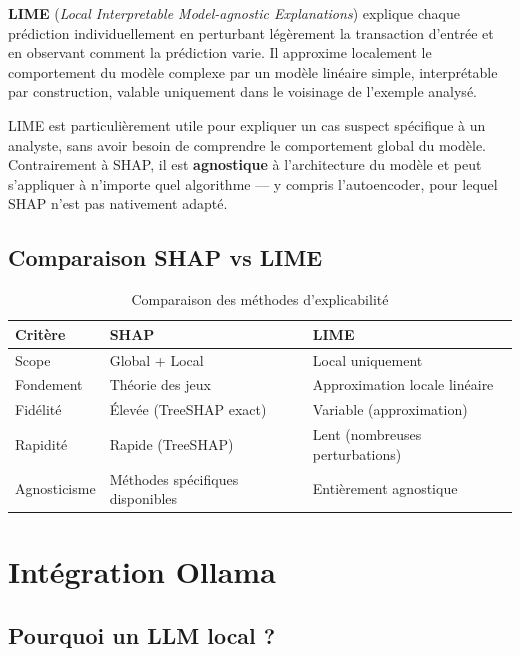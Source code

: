 \begin{definitionbox}
\textbf{LIME} (\textit{Local Interpretable Model-agnostic Explanations}) explique chaque
prédiction individuellement en perturbant légèrement la transaction d'entrée et en
observant comment la prédiction varie. Il approxime localement le comportement du modèle
complexe par un modèle linéaire simple, interprétable par construction, valable uniquement
dans le voisinage de l'exemple analysé.
\end{definitionbox}

LIME est particulièrement utile pour expliquer un cas suspect spécifique à un analyste,
sans avoir besoin de comprendre le comportement global du modèle. Contrairement à SHAP,
il est \textbf{agnostique} à l'architecture du modèle et peut s'appliquer à n'importe
quel algorithme --- y compris l'autoencoder, pour lequel SHAP n'est pas nativement adapté.

\subsection{Comparaison SHAP vs LIME}

\begin{table}[H]
\centering
\caption{Comparaison des méthodes d'explicabilité}
\label{tab:shap_lime}
\begin{tabular}{lll}
\toprule
\textbf{Critère} & \textbf{SHAP} & \textbf{LIME} \\
\midrule
Scope          & Global + Local & Local uniquement \\
Fondement      & Théorie des jeux & Approximation locale linéaire \\
Fidélité       & Élevée (TreeSHAP exact) & Variable (approximation) \\
Rapidité       & Rapide (TreeSHAP) & Lent (nombreuses perturbations) \\
Agnosticisme   & Méthodes spécifiques disponibles & Entièrement agnostique \\
\bottomrule
\end{tabular}
\end{table}

\section{Intégration Ollama}

\subsection{Pourquoi un LLM local ?}

